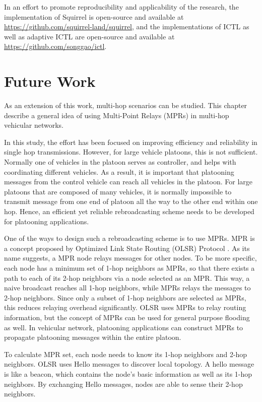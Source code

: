\documentclass[12pt]{report}
\begin{document}
In an effort to promote reproducibility and applicability of the research, the implementation of Squirrel is open-source and available at \url{https://github.com/squirrel-land/squirrel}, and the implementations of ICTL as well as adaptive ICTL are open-source and available at \url{https://github.com/songgao/ictl}.

\chapter{Future Work}

As an extension of this work, multi-hop scenarios can be studied. This chapter describe a general idea of using Multi-Point Relays (MPRs) in multi-hop vehicular networks.

In this study, the effort has been focused on improving efficiency and reliability in single hop transmissions. However, for large vehicle platoons, this is not sufficient. Normally one of vehicles in the platoon serves as controller, and helps with coordinating different vehicles. As a result, it is important that platooning messages from the control vehicle can reach all vehicles in the platoon. For large platoons that are composed of many vehicles, it is normally impossible to transmit message from one end of platoon all the way to the other end within one hop. Hence, an efficient yet reliable rebroadcasting scheme needs to be developed for platooning applications.

One of the ways to design such a rebroadcasting scheme is to use MPRs. MPR is a concept proposed by Optimized Link State Routing (OLSR) Protocol \cite{rfc3626}. As its name suggests, a MPR node relays messages for other nodes. To be more specific, each node has a minimum set of 1-hop neighbors as MPRs, so that there exists a path to each of its 2-hop neighbors via a node selected as an MPR. This way, a naive broadcast reaches all 1-hop neighbors, while MPRs relays the messages to 2-hop neighbors. Since only a subset of 1-hop neighbors are selected as MPRs, this reduces relaying overhead significantly. OLSR uses MPRs to relay routing information, but the concept of MPRs can be used for general purpose flooding as well. In vehicular network, platooning applications can construct MPRs to propagate platooning messages within the entire platoon.

To calculate MPR set, each node needs to know its 1-hop neighbors and 2-hop neighbors. OLSR uses Hello messages to discover local topology. A hello message is like a beacon, which contains the node's basic information as well as its 1-hop neighbors. By exchanging Hello messages, nodes are able to sense their 2-hop neighbors.
\end{document}
